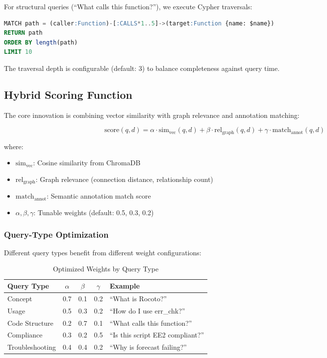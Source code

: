 \documentclass[11pt,letterpaper]{article}
\begin{document}
For structural queries (``What calls this function?''), we execute Cypher traversals:

\begin{lstlisting}[style=code, language=SQL, caption={Cypher Query for Call Chain}]
MATCH path = (caller:Function)-[:CALLS*1..5]->(target:Function {name: $name})
RETURN path
ORDER BY length(path)
LIMIT 10
\end{lstlisting}

The traversal depth is configurable (default: 3) to balance completeness against query time.

\subsection{Hybrid Scoring Function}

The core innovation is combining vector similarity with graph relevance and annotation matching:

\begin{equation}
    \text{score}(q, d) = \alpha \cdot \text{sim}_{\text{vec}}(q, d) + \beta \cdot \text{rel}_{\text{graph}}(q, d) + \gamma \cdot \text{match}_{\text{annot}}(q, d)
\end{equation}

where:
\begin{itemize}
    \item $\text{sim}_{\text{vec}}$: Cosine similarity from ChromaDB
    \item $\text{rel}_{\text{graph}}$: Graph relevance (connection distance, relationship count)
    \item $\text{match}_{\text{annot}}$: Semantic annotation match score
    \item $\alpha, \beta, \gamma$: Tunable weights (default: 0.5, 0.3, 0.2)
\end{itemize}

\subsubsection{Query-Type Optimization}

Different query types benefit from different weight configurations:

\begin{table}[H]
\centering
\caption{Optimized Weights by Query Type}
\begin{tabular}{@{}lcccp{4cm}@{}}
\toprule
\textbf{Query Type} & $\alpha$ & $\beta$ & $\gamma$ & \textbf{Example} \\
\midrule
Concept & 0.7 & 0.1 & 0.2 & ``What is Rocoto?'' \\
Usage & 0.5 & 0.3 & 0.2 & ``How do I use err\_chk?'' \\
Code Structure & 0.2 & 0.7 & 0.1 & ``What calls this function?'' \\
Compliance & 0.3 & 0.2 & 0.5 & ``Is this script EE2 compliant?'' \\
Troubleshooting & 0.4 & 0.4 & 0.2 & ``Why is forecast failing?'' \\
\bottomrule
\end{tabular}
\end{table}
\end{document}
